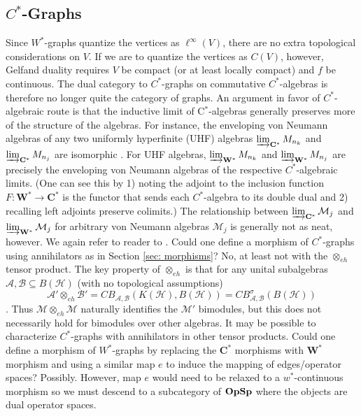 \documentclass[12pt]{article}
\theoremstyle{definition}
\newenvironment{remark}
  {\pushQED{\qed}\renewcommand{\qedsymbol}{\textcircled{\tiny R}}\remarkx}
  {\popQED\endremarkx}
\newcommand{\mc}[1]{\mathcal{#1}}
\newcommand{\<}{\langle}
\renewcommand{\>}{\rangle}
\renewcommand{\subset}{\subseteq}
\newcommand{\eh}{\otimes_{eh}}
\begin{document}
\subsection{\texorpdfstring{$C^*$}{}-Graphs}
    
\begin{remark}
    Since $W^*$-graphs quantize the vertices as $\ell^\infty(V)$, there are no extra topological considerations on $V$. If we are to quantize the vertices as $C(V)$, however, Gelfand duality requires $V$ be compact (or at least locally compact) and $f$ be continuous. The dual category to $C^*$-graphs on commutative $C^*$-algebras is therefore no longer quite the category of graphs.
\end{remark}
\begin{remark}
    An argument in favor of $C^*$-algebraic route is that the inductive limit of C$^*$-algebras generally preserves more of the structure of the algebras. For instance, the enveloping von Neumann algebras of any two uniformly hyperfinite (UHF) algebras $\varinjlim_{\mathbf{C^*}} M_{n_k}$ and $\varinjlim_{\mathbf{C^*}} M_{n_j}$ are isomorphic \cite[Corollary 5.2]{pedersenuhf}. For UHF algebras, $\varinjlim_{\mathbf{W^*}} M_{n_k}$ and $\varinjlim_{\mathbf{W^*}} M_{n_j}$ are precisely the enveloping von Neumann algebras of the respective $C^*$-algebraic limits. (One can see this by 1) noting the adjoint to the inclusion function $F: \mathbf{W^*} \to \mathbf{C^*}$ is the functor that sends each $C^*$-algebra to its double dual and 2) recalling left adjoints preserve colimits.) The relationship between $\varinjlim_{\mathbf{C^*}} \mc M_j$ and $\varinjlim_{\mathbf{W^*}} \mc M_j$ for arbitrary von Neumann algebras $\mc M_j$ is generally not as neat, however. We again refer to reader to \cite{guichardet}.
\end{remark}
\begin{remark}
    Could one define a morphism of $C^*$-graphs using annihilators as in Section \ref{sec: morphisms}? No, at least not with the $\eh$ tensor product. The key property of $\eh$ is that for any unital subalgebras $\mc A, \mc B \subset B(\mc H)$ (with no topological assumptions)
        \[
        \mc A' \eh \mc B' = CB_{\mc A,\mc B}(K(\mc H) , B(\mc H)) = CB^\sigma_{\mc A,\mc B}(B(\mc H))
        \]
        \cite[Theorem 4.2(ii)]{blecher-smith-w*h}. Thus $\mc M \eh \mc M$ naturally identifies the $\mc M'$ bimodules, but this does not necessarily hold for bimodules over other algebras. It may be possible to characterize $C^*$-graphs with annihilators in other tensor products.
\end{remark}
\begin{remark}
    Could one define a morphism of $W^*$-graphs by replacing the $\mathbf{C^*}$ morphisms with $\mathbf{W^*}$ morphism and using a similar map $e$ to induce the mapping of edges/operator spaces? Possibly. However, map $e$ would need to be relaxed to a $w^*$-continuous morphism so we must descend to a subcategory of ${\bf {OpSp}}$ where the objects are dual operator spaces. 
\end{remark}
\end{document}
